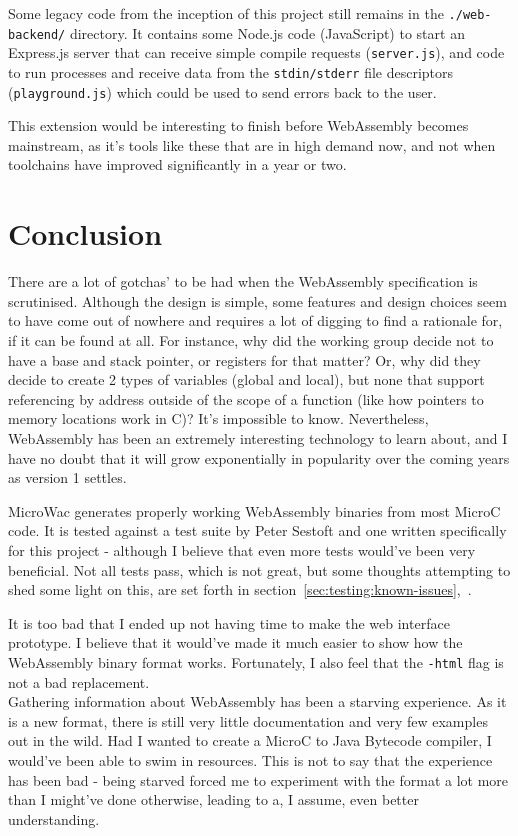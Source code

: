 \documentclass[a4paper]{article}
\begin{document}
Some legacy code from the inception of this project still remains in the \texttt{./web-backend/} directory. It contains some Node.js code (JavaScript) to start an Express.js server that can receive simple compile requests (\texttt{server.js}), and code to run processes and receive data from the \texttt{stdin/stderr} file descriptors (\texttt{playground.js}) which could be used to send errors back to the user.

This extension would be interesting to finish before WebAssembly becomes mainstream, as it's tools like these that are in high demand now, and not when toolchains have improved significantly in a year or two.

\newpage
\section{Conclusion}
\label{sec:conclusion}
There are a lot of gotchas' to be had when the WebAssembly specification is scrutinised. Although the design is simple, some features and design choices seem to have come out of nowhere and requires a lot of digging to find a rationale for, if it can be found at all. For instance, why did the working group decide not to have a base and stack pointer, or registers for that matter? Or, why did they decide to create 2 types of variables (global and local), but none that support referencing by address outside of the scope of a function (like how pointers to memory locations work in C)? It's impossible to know. Nevertheless, WebAssembly has been an extremely interesting technology to learn about, and I have no doubt that it will grow exponentially in popularity over the coming years as version 1 settles.

MicroWac generates properly working WebAssembly binaries from most MicroC code. It is tested against a test suite by Peter Sestoft and one written specifically for this project - although I believe that even more tests would've been very beneficial. Not all tests pass, which is not great, but some thoughts attempting to shed some light on this, are set forth in section~\ref{sec:testing:known-issues},~.

It is too bad that I ended up not having time to make the web interface prototype. I believe that it would've made it much easier to show how the WebAssembly binary format works. Fortunately, I also feel that the \texttt{-html} flag is not a bad replacement.\\

\noindent Gathering information about WebAssembly has been a starving experience. As it is a new format, there is still very little documentation and very few examples out in the wild. Had I wanted to create a MicroC to Java Bytecode compiler, I would've been able to swim in resources. This is not to say that the experience has been bad - being starved forced me to experiment with the format a lot more than I might've done otherwise, leading to a, I assume, even better understanding.\\
\end{document}
